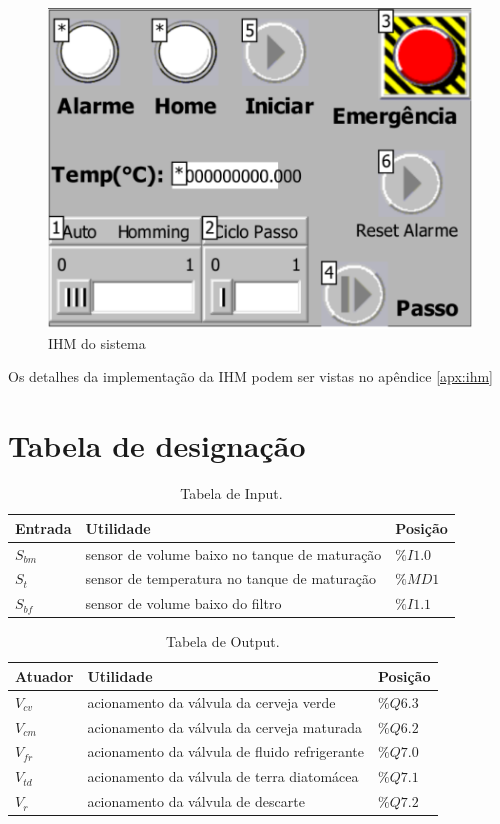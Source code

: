 \documentclass[12pt]{article}
\begin{document}
	\begin{figure}[H]
		\centering
		\label{fig:ihm}
		\includegraphics [width=0.8\linewidth]{ihmsmall.pdf}
		\caption{IHM do sistema}
	\end{figure}
	
	Os detalhes da implementação da IHM podem ser vistas no apêndice \ref{apx:ihm}

\section {Tabela de designação}
\begin{table}[H]
	\caption{Tabela de Input.}
	\centering
	\begin{tabular}{|  p{2cm} | p{10cm} | p{2cm} | }
		\hline
		Entrada & Utilidade & Posição\\
		\hline
		$S_{bm}$ & sensor de volume baixo no tanque de maturação & $\%I1.0$ \\
		$S_t$ & sensor de temperatura no tanque de maturação & $\%MD1$ \\
		$S_{bf}$ & sensor de volume baixo do filtro & $\%I1.1$ \\
		\hline
	\end{tabular}
\end{table}


\begin{table}[H]
	\caption{Tabela de Output.}
	\centering
	\begin{tabular}{|  p{2cm} | p{10cm} | p{2cm} | }
		\hline
		Atuador & Utilidade & Posição\\
		\hline
  		$V_{cv}$ & acionamento da válvula da cerveja verde & $\%Q6.3$ \\
  		$V_{cm}$ & acionamento da válvula da cerveja maturada & $\%Q6.2$ \\
 		$V_{fr}$ & acionamento da válvula de fluido refrigerante & $\%Q7.0$ \\
		$V_{td}$ & acionamento da válvula de terra diatomácea & $\%Q7.1$ \\
		$V_r$ & acionamento da válvula de descarte & $\%Q7.2$ \\
 		\hline
	\end{tabular}
\end{table}
\end{document}
